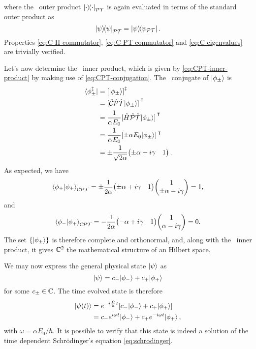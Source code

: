         where the \PT\ outer product $\dyad{\cdot}{\cdot}_{\PT}$ is again evaluated in terms of the standard outer product as 
        \begin{equation*}
            \dyad{\psi}{\psi}_{\PT} = \dyad{\psi}{\psi_{\PT}}
            \myperiod
        \end{equation*}
        Properties \eqref{eq:C-H-commutator}, \eqref{eq:C-PT-commutator} and \eqref{eq:C-eigenvalues} are trivially verified.

        Let's now determine the \CPT\ inner product, which is given by \eqref{eq:CPT-inner-product} by making use of \eqref{eq:CPT-conjugation}. The \CPT\ conjugate of $\ket{\phi_\pm}$ is
        \begin{align*}
            \bra*{\phi^\myconj_\pm}
            &= \bqty{\ket{\phi_\pm}}^\myconj \\
            &= \bqty*{\hCPT\!\ket{\phi_\pm}}^\intercal \\
            &= \frac{1}{\alpha E_0}\bqty*{\hH\hPT\!\ket{\phi_\pm}}^\intercal \\
            &= \frac{1}{\alpha E_0}\bqty*{\pm \alpha E_0 \! \ket{\phi_\pm}}^\intercal \\
            &= \pm\frac{1}{\sqrt{2\alpha}}\!\pmqty{\pm\alpha + i\gamma & 1}
            \myperiod
        \end{align*}
        As expected, we have
        \begin{equation}
            \braket{\phi_\pm}{\phi_\pm}_{\CPT} =  \pm\frac{1}{2\alpha}\!\pmqty{\pm\alpha + i\gamma & 1} \! \pmqty{1 \\ \pm\alpha - i \gamma} = 1
            \mycomma
        \end{equation}
        and
        \begin{equation}
            \braket{\phi_-}{\phi_+}_{\CPT} = -\frac{1}{2\alpha}\!\pmqty{-\alpha + i\gamma & 1}\!\pmqty{1 \\ \alpha - i \gamma} = 0
            \myperiod
        \end{equation}
        The set $\qty{\ket{\phi_\pm}}$ is therefore complete and orthonormal, and, along with the \CPT\ inner product, it gives $\mathbb{C}^2$ the mathematical structure of an Hilbert space.

        We may now express the general physical state $\ket{\psi}$ as 
        \begin{equation*}
            \ket{\psi} = c_{-}\!\ket{\phi_{-}} + c_{+}\!\ket{\phi_+}
        \end{equation*}
        for some $c_\pm\in\mathbb{C}$. The time evolved state is therefore
        \begin{align*}
            \ket{\psi\pqty{t}} 
            &= \myexp{-i\frac{\hH}{\hbar}t}\bqty*{c_{-}\!\ket{\phi_{-}} + c_{+}\!\ket{\phi_{+}}}\\
            &= c_{-}\myexp{i\omega t}\! \ket{\phi_{-}} + c_{+}\myexp{-i \omega t}\!\ket{\phi_{+}}
            \mycomma
        \end{align*}
        with $\omega = \alpha E_0 / \hbar$. It is possible to verify that this state is indeed a solution of the time dependent Schr\"odinger's equation \eqref{eq:schrodinger}.

